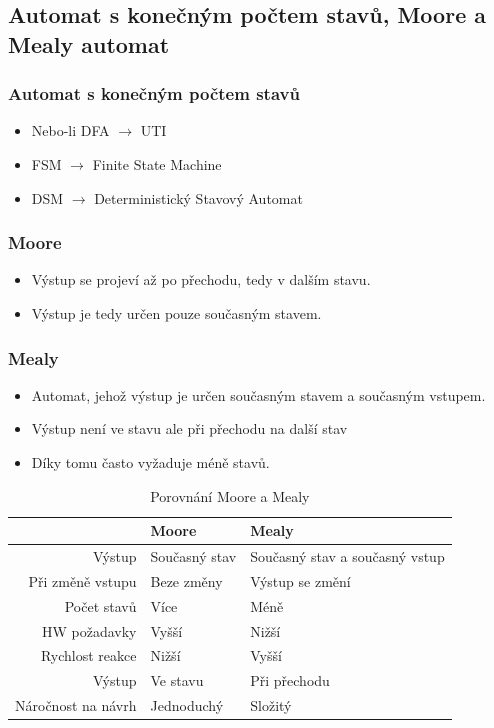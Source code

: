 \documentclass[10pt,a4paper]{article}
\begin{document}
\subsection{Automat s konečným počtem stavů, Moore a Mealy automat}
\subsubsection{Automat s konečným počtem stavů}
\begin{itemize}
\item Nebo-li DFA $\rightarrow$ UTI
\item FSM $\rightarrow$ Finite State Machine
\item DSM $\rightarrow$ Deterministický Stavový Automat
\end{itemize}

\subsubsection{Moore}
\begin{itemize}
\item Výstup se projeví až po přechodu, tedy v dalším stavu.
\item Výstup je tedy určen pouze současným stavem.
\end{itemize}

\subsubsection{Mealy}
\begin{itemize}
\item Automat, jehož výstup je určen současným stavem a současným vstupem. 
\item Výstup není ve stavu ale při přechodu na další stav
\item Díky tomu často vyžaduje méně stavů.
\end{itemize}
\begin{table}[ht]
\centering
\begin{tabular}{rll}
\hline
                   & Moore         & Mealy                          \\
                   \hline
Výstup             & Současný stav & Současný stav a současný vstup \\
Při změně vstupu   & Beze změny    & Výstup se změní                \\
Počet stavů        & Více          & Méně                           \\
HW požadavky       & Vyšší         & Nižší                          \\
Rychlost reakce    & Nižší         & Vyšší                          \\
Výstup             & Ve stavu      & Při přechodu                   \\
Náročnost na návrh & Jednoduchý    & Složitý             \\ \hline          
\end{tabular}
\caption{Porovnání Moore a Mealy}
\label{tab:fsm}
\end{table}
\end{document}
